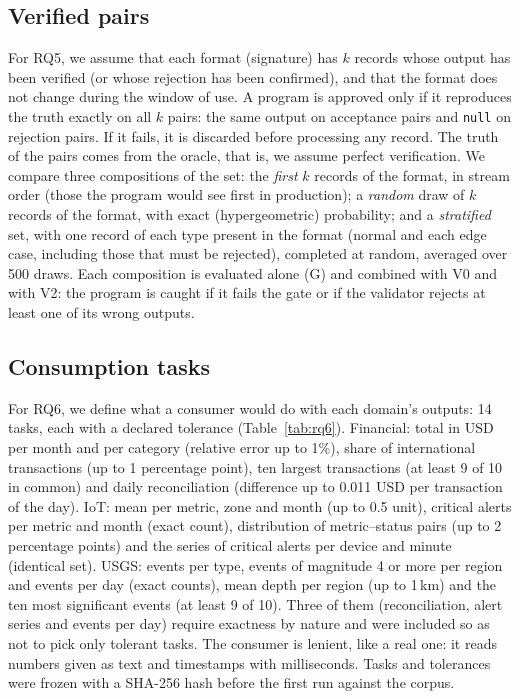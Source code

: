 \documentclass[sigconf,nonacm]{acmart}
\begin{document}
\subsection{Verified pairs}
\label{sec:desenho-golden}

For RQ5, we assume that each format (signature) has $k$ records whose output has been verified (or whose rejection has been confirmed), and that the format does not change during the window of use. A program is approved only if it reproduces the truth exactly on all $k$ pairs: the same output on acceptance pairs and \texttt{null} on rejection pairs. If it fails, it is discarded before processing any record. The truth of the pairs comes from the oracle, that is, we assume perfect verification. We compare three compositions of the set: the \textit{first} $k$ records of the format, in stream order (those the program would see first in production); a \textit{random} draw of $k$ records of the format, with exact (hypergeometric) probability; and a \textit{stratified} set, with one record of each type present in the format (normal and each edge case, including those that must be rejected), completed at random, averaged over 500 draws. Each composition is evaluated alone (G) and combined with V0 and with V2: the program is caught if it fails the gate or if the validator rejects at least one of its wrong outputs.

\subsection{Consumption tasks}
\label{sec:desenho-tarefas}

For RQ6, we define what a consumer would do with each domain's outputs: 14 tasks, each with a declared tolerance (Table~\ref{tab:rq6}). Financial: total in USD per month and per category (relative error up to 1\%), share of international transactions (up to 1 percentage point), ten largest transactions (at least 9 of 10 in common) and daily reconciliation (difference up to 0.011 USD per transaction of the day). IoT: mean per metric, zone and month (up to 0.5 unit), critical alerts per metric and month (exact count), distribution of metric--status pairs (up to 2 percentage points) and the series of critical alerts per device and minute (identical set). USGS: events per type, events of magnitude 4 or more per region and events per day (exact counts), mean depth per region (up to 1\,km) and the ten most significant events (at least 9 of 10). Three of them (reconciliation, alert series and events per day) require exactness by nature and were included so as not to pick only tolerant tasks. The consumer is lenient, like a real one: it reads numbers given as text and timestamps with milliseconds. Tasks and tolerances were frozen with a SHA-256 hash before the first run against the corpus.
\end{document}

